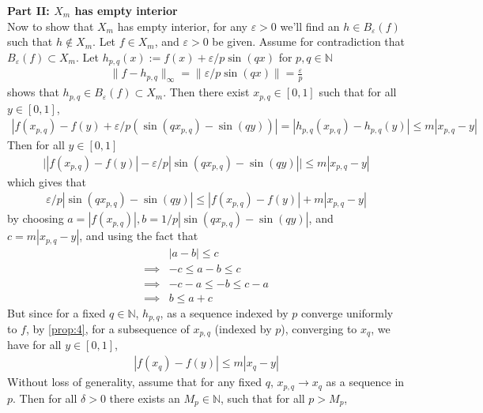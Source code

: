 \documentclass[12pt]{exam}
\theoremstyle{plain} %
\theoremstyle{definition} %
\theoremstyle{remark} %
\begin{document}
\begin{questions}
\begin{solution}
    \textbf{Part II: $X_m$ has empty interior}\\
    Now to show that $X_m$ has empty interior, for any $\varepsilon >
    0$ we'll find an $h \in B_\varepsilon(f)$ such that $h \not\in
    X_m$. Let $f \in X_m$, and $\varepsilon > 0$ be given. Assume for
    contradiction that $B_\varepsilon(f) \subset X_m$. Let
    $h_{p, q}(x) := f(x) + \varepsilon/p\sin(qx)$ for $p, q \in \mathbb{N}$
    \begin{align*}
      \|f - h_{p, q}\|_\infty = \| \varepsilon/p \sin(qx)\| =
      \frac{\varepsilon}{p}
    \end{align*}
    shows that $h_{p, q} \in B_\varepsilon(f) \subset X_m$.
    Then there exist $x_{p, q} \in [0, 1]$ such that for all $y \in [0, 1]$,
    \begin{align*}
      |f(x_{ p, q}) - f( y) + \varepsilon/p (\sin(q x_{p, q}) - \sin( qy))| =
      |h_{p, q}(x_{p, q}) - h_{p, q}(y)| \le m |x_{ p, q} - y|
    \end{align*}
    Then for all $y \in [0, 1]$
    \begin{align*}
      \big||f(x_{p, q}) - f(y)| -  \varepsilon/p |\sin(qx_{p, q}) - \sin(qy)|
      \big| \le m |x_{p, q} - y|
    \end{align*}
    which gives that
    \begin{align*}
      \varepsilon/p |\sin(qx_{p, q}) - \sin(q y)| \le |f(x_{p, q}) - f(y)| + m
      |x_{p, q} - y|
    \end{align*}
    by choosing $a = |f(x_{p, q})|, b = 1/p |\sin(q x_{p, q}) -
    \sin(qy)|$, and $c = m |x_{p, q} - y|$, and using the fact that
    \begin{align*}
      &|a - b| \le c \\
      \implies &-c \le a - b \le c \\
      \implies &-c - a \le -b \le c - a \\
      \implies & b \le a + c
    \end{align*}
    But since for a fixed $q \in \mathbb{N}$, $h_{p, q}$, as a
    sequence indexed by $p$ converge uniformly to $f$, by
    \autoref{prop:4}, for a subsequence of $x_{p, q}$ (indexed by
    $p$), converging to $x_q$, we have for all $y \in [0, 1]$,
    \begin{align*}
      |f(x_q) - f(y)| \le m |x_q - y|
    \end{align*}
    Without loss of generality, assume that for any fixed $q$, $x_{p,
    q} \to x_q$ as a sequence in $p$. Then for all $\delta > 0$ there
    exists an $M_p \in \mathbb{N}$, such that for all $p > M_p$,

\end{solution}
\end{questions}
\end{document}
